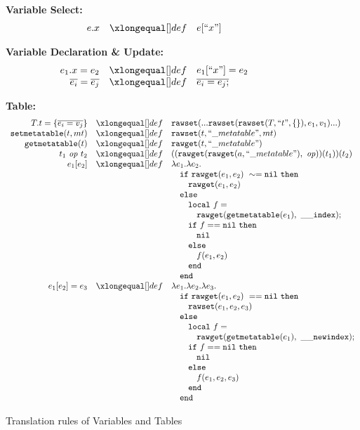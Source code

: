 \begin{figure}
\caption{Translation rules of Variables and Tables}\label{fig:desLuaVar}\label{fig:desLuaTable}
{\bf Variable Select:}\[
\begin{array}{rclcl}

\desugar{e.x}{e[``x"]}

\end{array}\]

{\bf Variable Declaration \& Update:}\[
\begin{array}{rclcl}

\desugar{e_1.x=e_2}{e_1[``x"] = e_2}
\desugar{\overline{e_i}=\overline{e_j}}{\overline{e_i = e_j;}}
\end{array}\]


{\bf Table:}\[
\begin{array}{rclcl}
\desugar{T.t = \{\overline{e_i = v_j}\}}{{\tt rawset}(...{\tt rawset}({\tt rawset}(T,``t", \{\}), e_1, v_1)...)}
\desugar{{\tt setmetatable}(t, mt)}{{\tt rawset}(t,``\_metatable", mt)}
\desugar{{\tt getmetatable}(t)}{{\tt rawget}(t,``\_metatable")}
\desugar{t_1~{\it op}~t_2}{(({\tt rawget}({\tt rawget}(a,``\_metatable"),~{\it op}))(t_1))(t_2)}
\desugar{e_1[e_2]}{\lambda e_1.\lambda e_2.}
\desugarline{ 
\quad{\tt if}~ {\tt rawget}(e_1, e_2) ~\sim= {\tt nil} ~ {\tt then}\\
\quad\quad{\tt rawget}(e_1, e_2) ~\\
\quad{\tt else}\\
\quad\quad{\tt local}~f = \\
\quad\quad\quad {\tt rawget}({\tt getmetatable}(e_1),~{\tt{\_}{\_}index});\\
\quad\quad{\tt if}~ f == {\tt nil} ~ {\tt then}\\
\quad\quad\quad {\tt nil} \\
\quad\quad{\tt else}\\
\quad\quad\quad f(e_1,e_2)\\ 
\quad\quad{\tt end}\\
\quad{\tt end}\\
}
\desugar{e_1[e_2]=e_3}{
\lambda e_1.\lambda e_2.\lambda e_3.
}
\desugarline{ 
\quad{\tt if}~ {\tt rawget}(e_1, e_2) ~== {\tt nil} ~ {\tt then}\\
\quad\quad{\tt rawset}(e_1, e_2,e_3) ~\\
\quad{\tt else}\\
\quad\quad{\tt local}~f = \\
\quad\quad\quad{\tt rawget}({\tt getmetatable}(e_1),~{\tt{\_}{\_}newindex});\\
\quad\quad{\tt if}~ f == {\tt nil} ~ {\tt then}\\
\quad\quad\quad {\tt nil} \\
\quad\quad{\tt else}\\
\quad\quad\quad f(e_1,e_2,e_3)\\ 
\quad\quad{\tt end}\\
\quad{\tt end}\\
}
\end{array}\]
\end{figure}

